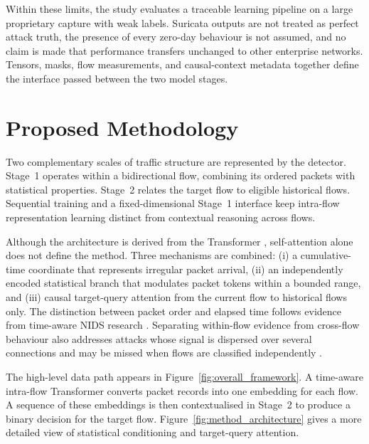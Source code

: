 \documentclass[11pt,fleqn]{report}
\begin{document}
Within these limits, the study evaluates a traceable learning pipeline on a large proprietary capture with weak labels. Suricata outputs are not treated as perfect attack truth, the presence of every zero-day behaviour is not assumed, and no claim is made that performance transfers unchanged to other enterprise networks. Tensors, masks, flow measurements, and causal-context metadata together define the interface passed between the two model stages.

\providecommand{\methodfield}[1]{\texttt{\detokenize{#1}}}

\chapter{Proposed Methodology}
\label{sec:proposed_methodology}

Two complementary scales of traffic structure are represented by the detector. Stage~1 operates within a bidirectional flow, combining its ordered packets with statistical properties. Stage~2 relates the target flow to eligible historical flows. Sequential training and a fixed-dimensional Stage~1 interface keep intra-flow representation learning distinct from contextual reasoning across flows.

Although the architecture is derived from the Transformer \cite{Vaswani2017}, self-attention alone does not define the method. Three mechanisms are combined: (i) a cumulative-time coordinate that represents irregular packet arrival, (ii) an independently encoded statistical branch that modulates packet tokens within a bounded range, and (iii) causal target-query attention from the current flow to historical flows only. The distinction between packet order and elapsed time follows evidence from time-aware NIDS research \cite{Han2023GTID}. Separating within-flow evidence from cross-flow behaviour also addresses attacks whose signal is dispersed over several connections and may be missed when flows are classified independently
\cite{LiuPatras2022NetSentry,Manocchio2024FlowTransformer, MartinReizabal2026FlowWindow}.

The high-level data path appears in Figure~\ref{fig:overall_framework}. A time-aware intra-flow Transformer converts packet records into one embedding for each flow. A sequence of these embeddings is then contextualised in Stage~2 to produce a binary decision for the target flow. Figure~\ref{fig:method_architecture} gives a more detailed view of statistical conditioning and target-query attention.
\end{document}
